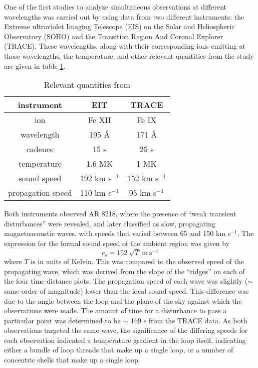 \documentclass[preprint2]{aastex}
\begin{document}
One of the first studies to analyze
simultaneous observations at different wavelengths was carried out by
\cite{pac_1} using data from two different instruments:
the Extreme ultraviolet Imaging Telescope (EIS)
on the Solar and Heliospheric Observatory (SOHO) and the
Transition Region And Coronal Explorer (TRACE).
These wavelengths, along with their corresponding ions emitting at those
wavelengths, the temperature, and other relevant quantities from the
study are given in table {\ref{stuff}}.
\begin{table}[h]
\centering
\begin{tabular}{c c c}
\hline\hline
instrument & EIT & TRACE\\
\hline
ion & Fe {\footnotesize XII} & Fe {\footnotesize IX}\\
wavelength & 195 \AA{} & 171 \AA{}\\
cadence & 15 s & 25 s\\
temperature & 1.6 MK & 1 MK\\
sound speed & 192 km s$^{-1}$ & 152 km s$^{-1}$\\
propagation speed & 110 km s$^{-1}$ & 95 km s$^{-1}$\\
\hline\hline
\end{tabular}
\caption{Relevant quantities from \cite{pac_1}}
\label{stuff}
\end{table}
Both instruments observed AR 8218, where the presence of
``weak transient disturbances'' were revealed, and later classified as
slow, propagating magnetoacoustic waves, with speeds that varied
between 65 and 150 km s$^{-1}$.
The expression for the formal sound speed of the ambient region
was given by
\begin{equation}
    c_{s} = 152\ \sqrt{T}\ \textrm{m}\ \textrm{s}^{-1}
\end{equation}
where $T$ is in units of Kelvin.
This was compared to the observed speed of the propagating wave, which
was derived from the slope of the ``ridges'' on each of the four
time-distance plots.
The propagation speed of each wave was slightly ($\sim$ same order of
magnitude) lower than the local sound speed. This difference
was due to the angle between the loop and the plane of the sky against
which the observations were made.
The amount of time for a disturbance to pass a particular point was
determined to be $\sim$ 169 s from the TRACE data.
As both observations targeted the same wave, the significance of the
differing speeds for each observation indicated a temperature gradient
in the loop itself, indicating either a bundle of loop threads that
make up a single loop, or a number of concentric shells that make up a
single loop.
\end{document}
